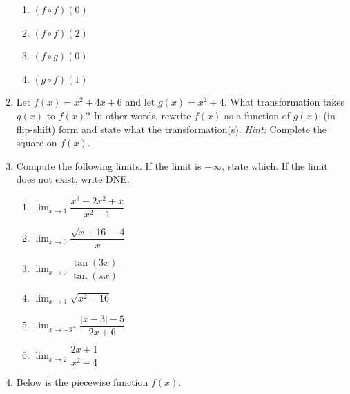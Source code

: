 \documentclass[12pt]{article}
\newcommand{\ds}{\displaystyle}
\begin{document}
\begin{enumerate}
\begin{enumerate}
    \item $(f\circ f)(0)$
    \vfill
    \item $(f\circ f)(2)$
    \vfill
    \item $(f\circ g)(0)$
    \vfill
    \item $(g\circ f)(1)$
    \vfill
\end{enumerate}
\pagebreak

\item Let $f(x) = x^2 + 4x + 6$ and let $g(x) = x^2 + 4$. What transformation takes $g(x)$ to $f(x)$? In other words, rewrite $f(x)$ as a function of $g(x)$ (in flip-shift) form and state what the transformation(s). \emph{Hint:} Complete the square on $f(x)$.

\pagebreak

\item Compute the following limits. If the limit is $\pm\infty$, state which. If the limit does not exist, write DNE. 

    \begin{enumerate}
        \item $\ds\lim_{x\to 1} \dfrac{x^3-2x^2+x}{x^2-1}$
        \vfill
        
        \item $\ds\lim_{x\to 0} \dfrac{\sqrt{x+16}-4}{x}$
        \vfill
        
        \item $\ds\lim_{x\to 0} \dfrac{\tan(3x)}{\tan(\pi x)}$
        \vfill
    
    
     \pagebreak
     
        \item $\ds\lim_{x\to 4} \sqrt{x^2-16}$
        \vfill

        \item $\ds\lim_{x\to -3^+} \dfrac{|x-3|-5}{2x+6}$
        \vfill

        \item $\ds\lim_{x\to 2} \dfrac{2x+1}{x^2-4}$
        \vfill
\end{enumerate}

\pagebreak
\item Below is the piecewise function $f(x)$.

\end{enumerate}
\end{document}
